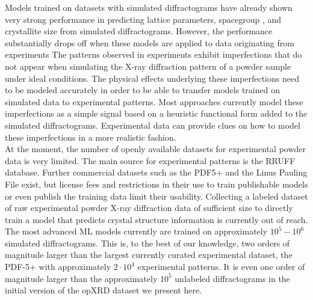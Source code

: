 Models trained on datasets with simulated diffractograms have already shown very strong performance in predicting lattice parameters\cite{Dong2021, Chitturi2021, Habershon2004, zhang2024crystallographic}, spacegroup \cite{cao2024simxrd,Schopmans2023, Oviedo2018, Park2017, Vecsei2018, Zaloga2020, Suzuki2020, Chakraborty2021,zhang2024crystallographic}, and crystallite size \cite{Dong2021, Chakraborty2021} from simulated diffractograms.
However, the performance substantially drops off when these models are applied to data originating from experiments \cite{cao2024simxrd,Schopmans2023,zhang2024crystallographic, Wang2020, Vecsei2018} The patterns observed in experiments exhibit imperfections that do not appear when simulating the X-ray diffraction pattern of a powder sample under ideal conditions. The physical effects underlying these imperfections need to be modeled accurately in order to be able to transfer models trained on simulated data to experimental patterns. Most approaches currently model these imperfections as a simple signal based on a heuristic functional form added to the simulated diffractograms. Experimental data can provide clues on how to model these imperfections in a more realistic fashion. \\

At the moment, the number of openly available datasets for experimental powder data is very limited. The main source for experimental patterns is the RRUFF database\cite{lafuente2015}. Further commercial datasets such as the PDF5+\cite{GatesRector2019} and the Linus Pauling File\cite{villars2018} exist, but license fees and restrictions in their use to train publishable models or even publish the training data limit their usability. Collecting a labeled dataset of raw experimental powder X-ray diffraction data of sufficient size to directly train a model that predicts crystal structure information is currently out of reach. The most advanced ML models currently are trained on approximately $10^5 - 10^6$ simulated diffractograms. \cite{Salgado2023, Schopmans2023} This is, to the best of our knowledge, two orders of magnitude larger than the largest currently curated experimental dataset, the PDF-5+ with approximately $2\cdot 10^4$ experimental patterns. It is even one order of magnitude larger than the approximately $10^5$ unlabeled diffractograms in the initial version of the opXRD dataset we present here.\\


